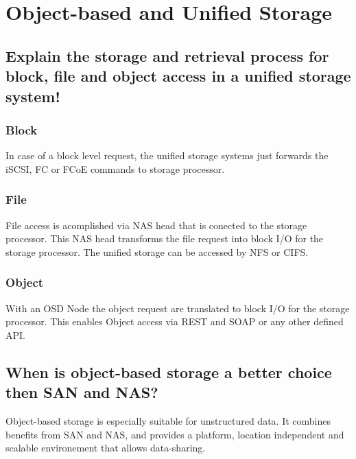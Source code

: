 \section{Object-based and Unified Storage} %
\label{sec:object_based_and_unified_storage}

\subsection{Explain the storage and retrieval process for block, file and object access in a unified storage system!} %
\label{sub:explain_the_storage_and_retrieval_process_for_block_file_and_object_access_in_a_unified_storage_system!}
	\subsubsection{Block} %
	\label{ssub:block}
		In case of a block level request,
		the unified storage systems just forwards the iSCSI, FC
		or FCoE commands to storage processor.
	\subsubsection{File} %
	\label{ssub:file}
		File access is acomplished via NAS head that is conected to the storage processor.
		This NAS head transforms the file request into block I/O for the storage processor.
		The unified storage can be accessed by NFS or CIFS.
	\subsubsection{Object} %
	\label{ssub:object}
		With an OSD Node the object request are translated to block I/O for the storage processor.
		This enables Object access via REST and SOAP or any other defined API.

\subsection{When is object-based storage a better choice then SAN and NAS?} %
\label{sub:when_is_object_based_storage_a_better_choice_then_san_and_nas}
	Object-based storage is especially suitable for unstructured data.
	It combines benefits from SAN and NAS,
	and provides a platform, location independent and scalable
	environement that allows data-sharing.

